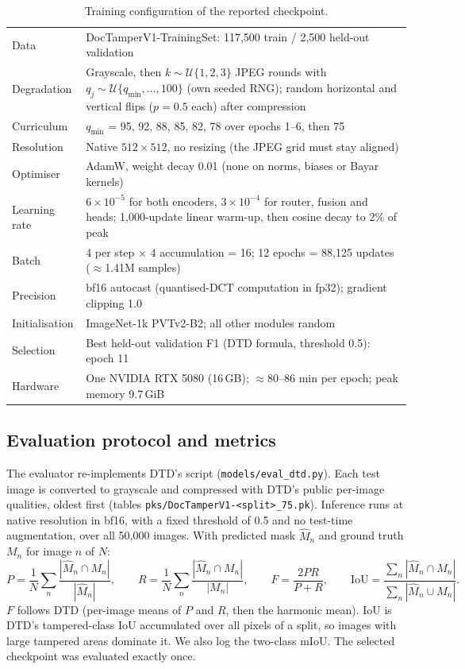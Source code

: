 \documentclass[11pt,a4paper]{article}
\begin{document}
\begin{table}[!htbp]
\centering
\caption{Training configuration of the reported checkpoint.}
\label{tab:train}
\small
\begin{tabularx}{\textwidth}{@{}lX@{}}
\toprule
Data & DocTamperV1-TrainingSet: 117{,}500 train / 2{,}500 held-out validation \\
Degradation & Grayscale, then $k\sim\mathcal{U}\{1,2,3\}$ JPEG rounds with
  $q_j\sim\mathcal{U}\{q_{\min},\dots,100\}$ (own seeded RNG); random horizontal and vertical
  flips ($p=0.5$ each) after compression \\
Curriculum & $q_{\min}$ = 95, 92, 88, 85, 82, 78 over epochs 1--6, then 75 \\
Resolution & Native $512\times512$, no resizing (the JPEG grid must stay aligned) \\
Optimiser & AdamW, weight decay 0.01 (none on norms, biases or Bayar kernels) \\
Learning rate & $6\times10^{-5}$ for both encoders, $3\times10^{-4}$ for router, fusion and heads;
  1{,}000-update linear warm-up, then cosine decay to 2\% of peak \\
Batch & 4 per step $\times$ 4 accumulation = 16; 12 epochs = 88{,}125 updates ($\approx$1.41M samples) \\
Precision & bf16 autocast (quantised-DCT computation in fp32); gradient clipping 1.0 \\
Initialisation & ImageNet-1k PVTv2-B2; all other modules random \\
Selection & Best held-out validation F1 (DTD formula, threshold 0.5): epoch 11 \\
Hardware & One NVIDIA RTX 5080 (16\,GB); $\approx$80--86 min per epoch; peak memory 9.7\,GiB \\
\bottomrule
\end{tabularx}
\end{table}

\subsection{Evaluation protocol and metrics}
The evaluator re-implements DTD's script (\texttt{models/eval\_dtd.py}). Each test image is
converted to grayscale and compressed with DTD's public per-image qualities, oldest first
(tables \texttt{pks/}\allowbreak\texttt{DocTamperV1-<split>\_75.pk}). Inference runs at native resolution in
bf16, with a fixed threshold of 0.5 and no test-time augmentation, over all 50{,}000 images.
With predicted mask $\hat M_n$ and ground truth $M_n$ for image $n$ of $N$:
\begin{equation}
P=\frac{1}{N}\sum_{n}\frac{|\hat M_n\cap M_n|}{|\hat M_n|},\qquad
R=\frac{1}{N}\sum_{n}\frac{|\hat M_n\cap M_n|}{|M_n|},\qquad
F=\frac{2PR}{P+R},\qquad
\mathrm{IoU}=\frac{\sum_n|\hat M_n\cap M_n|}{\sum_n|\hat M_n\cup M_n|}.
\end{equation}
$F$ follows DTD (per-image means of $P$ and $R$, then the harmonic mean). IoU is DTD's
tampered-class IoU accumulated over all pixels of a split, so images with large tampered areas
dominate it. We also log the two-class mIoU. The selected checkpoint was evaluated exactly once.
\end{document}

